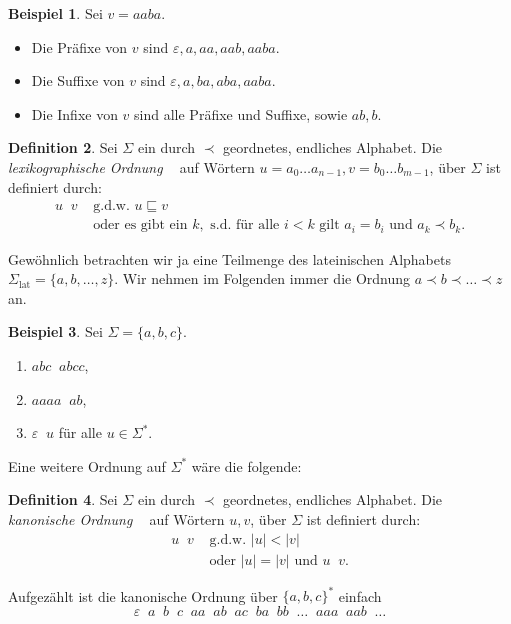 \documentclass[11pt, a4paper]{article}
\theoremstyle{definition}
\newtheorem{definition}{Definition}[section]
\newtheorem{example}[definition]{Beispiel}
\theoremstyle{plain}
\numberwithin{equation}{section}
\DeclareMathOperator{\lex}{\prec_\text{lex}}
\DeclareMathOperator{\canon}{\prec_\text{cn}}
\begin{document}
\begin{example}
	Sei $v = aaba$.
	\begin{itemize}
		\item Die Präfixe von $v$ sind $\varepsilon, a, aa, aab, aaba$.
		\item Die Suffixe von $v$ sind $\varepsilon, a, ba, aba, aaba$.
		\item Die Infixe von $v$ sind alle Präfixe und Suffixe, sowie $ab, b$.
	\end{itemize}
\end{example}
\begin{definition}
	Sei $\Sigma$ ein durch $\prec$ geordnetes, endliches Alphabet. Die \textit{lexikographische Ordnung} $\lex$ auf Wörtern $u = a_0 \ldots a_{n-1}, v = b_0 \ldots b_{m-1}$, über $\Sigma$ ist definiert durch:
	\begin{align*}
		u \lex v &\text{ g.d.w. } u \sqsubseteq v\\
		& \text{ oder es gibt ein } k, \text{ s.d. für alle } i < k \text{ gilt } a_i = b_i \text{ und } a_k \prec b_k.
	\end{align*}
\end{definition}
Gewöhnlich betrachten wir ja eine Teilmenge des lateinischen Alphabets $\Sigma_\text{lat} = \{a, b, \ldots, z\}$. Wir nehmen im Folgenden immer die Ordnung $a \prec b \prec \ldots \prec z$ an.
\begin{example}
	Sei $\Sigma = \{a, b, c\}$.
	\begin{enumerate}[label=\arabic*)]
		\item $abc \lex abcc$,
		\item $aaaa \lex ab$,
		\item $\varepsilon \lex u$ für alle $u \in \Sigma^\ast$.
	\end{enumerate}
\end{example}
Eine weitere Ordnung auf $\Sigma^\ast$ wäre die folgende:
\begin{definition}
	Sei $\Sigma$ ein durch $\prec$ geordnetes, endliches Alphabet. Die \textit{kanonische Ordnung} $\canon$ auf Wörtern $u, v$, über $\Sigma$ ist definiert durch:
	\begin{align*}
		u \canon v &\text{ g.d.w. } |u| < |v|\\
		&\text{ oder } |u| = |v| \text{ und } u \lex v.
	\end{align*}
\end{definition}
Aufgezählt ist die kanonische Ordnung über $\{a, b, c\}^\ast$ einfach
$$
	\varepsilon \canon a \canon b \canon c \canon aa \canon ab \canon ac \canon ba \canon bb \canon \ldots \canon aaa \canon aab \canon \ldots	
$$
\end{document}
